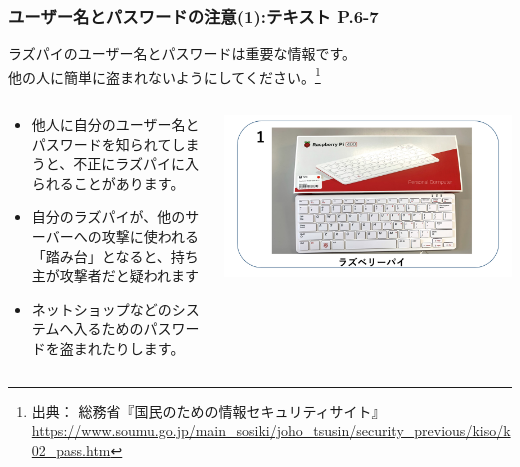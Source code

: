 \documentclass[dvipdfmx]{beamer}
\begin{document}
\begin{frame}[fragile]
	\frametitle{ユーザー名とパスワードの注意(1):テキスト P.6-7~~~}
	ラズパイのユーザー名とパスワードは重要な情報です。\\
	他の人に簡単に盗まれないようにしてください。\footnote{出典： 総務省『国民のための情報セキュリティサイト』\url{https://www.soumu.go.jp/main_sosiki/joho_tsusin/security_previous/kiso/k02_pass.htm}
	}
	\begin{columns}[b]
		\begin{column}{0.8\textwidth}
				\begin{itemize}
					\item 他人に自分のユーザー名とパスワードを知られてしまうと、不正にラズパイに入られることがあります。
					\item 自分のラズパイが、他のサーバーへの攻撃に使われる「踏み台」となると、持ち主が攻撃者だと疑われます
					\item ネットショップなどのシステムへ入るためのパスワードを盗まれたりします。
				\end{itemize}
				\end{column}
		\begin{column}{0.2\textwidth}
	 \includegraphics[width=\textwidth]{textbook-img009-2023.png}
				\end{column}
				\end{columns}

\end{frame}
\end{document}

